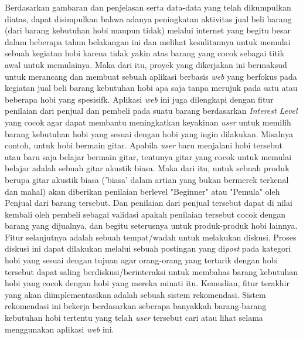 \documentclass[a4paper]{article}
\begin{document}
Berdasarkan gambaran dan penjelasan serta data-data yang telah dikumpulkan diatas, dapat disimpulkan bahwa adanya peningkatan aktivitas jual beli barang (dari barang kebutuhan hobi maupun tidak) melalui internet yang begitu besar dalam beberapa tahun belakangan ini dan melihat kesulitannya untuk memulai sebuah kegiatan hobi karena tidak yakin atas barang yang cocok sebagai titik awal untuk memulainya. Maka dari itu, proyek yang dikerjakan ini bermaksud untuk merancang dan membuat sebuah aplikasi berbasis \textit{web} yang berfokus pada kegiatan jual beli barang kebutuhan hobi apa saja tanpa merujuk pada satu atau beberapa hobi yang spesisifk. Aplikasi \textit{web} ini juga dilengkapi dengan fitur penilaian dari penjual dan pembeli pada suatu barang berdasarkan \textit{Interest Level} yang cocok agar dapat membantu meningkatkan keyakinan \textit{user} untuk memilih barang kebutuhan hobi yang sesuai dengan hobi yang ingin dilakukan. Misalnya contoh, untuk hobi bermain gitar. Apabila \textit{user} baru menjalani hobi tersebut atau baru saja belajar bermain gitar, tentunya gitar yang cocok untuk memulai belajar adalah sebuah gitar akustik biasa. Maka dari itu, untuk sebuah produk berupa gitar akustik biasa ('biasa' dalam artian yang bukan bermerek terkenal dan mahal) akan diberikan penilaian berlevel "Beginner" atau "Pemula" oleh Penjual dari barang tersebut. Dan penilaian dari penjual tersebut dapat di nilai kembali oleh pembeli sebagai validasi apakah penilaian tersebut cocok dengan barang yang dijualnya, dan begitu seterusnya untuk produk-produk hobi lainnya. Fitur selanjutnya adalah sebuah tempat/wadah untuk melakukan diskusi. Proses diskusi ini dapat dilakukan melalui sebuah postingan yang di\textit{post} pada kategori hobi yang sesuai dengan tujuan agar orang-orang yang tertarik dengan hobi tersebut dapat saling berdiskusi/berinteraksi untuk membahas barang kebutuhan hobi yang cocok dengan hobi yang mereka minati itu. Kemudian, fitur terakhir yang akan diimplementasikan adalah sebuah sistem rekomendasi. Sistem rekomendasi ini bekerja berdasarkan seberapa banyakkah barang-barang kebutuhan hobi tertentu yang telah \textit{user} tersebut cari atau lihat selama menggunakan aplikasi \textit{web} ini.


\end{document}

